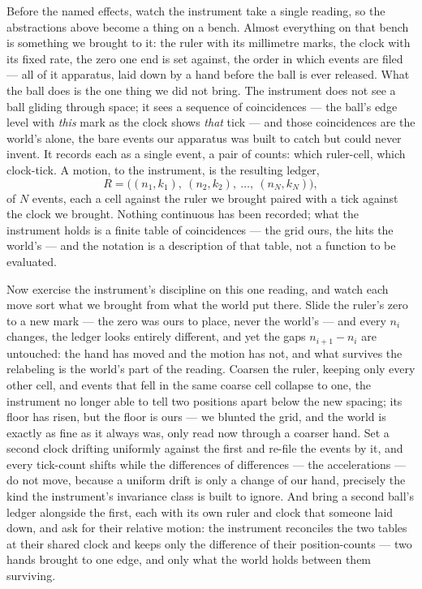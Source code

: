 Before the named effects, watch the instrument take a single reading, so the abstractions above become a
thing on a bench. Almost everything on that bench is something we brought to it: the ruler with its millimetre
marks, the clock with its fixed rate, the zero one end is set against, the order in which events are filed ---
all of it apparatus, laid down by a hand before the ball is ever released. What the ball does is the one thing
we did not bring. The instrument does not see a ball gliding through space; it sees a sequence of coincidences
--- the ball's edge level with \emph{this} mark as the clock shows \emph{that} tick --- and those coincidences
are the world's alone, the bare events our apparatus was built to catch but could never invent. It records
each as a single event, a pair of counts: which ruler-cell, which clock-tick. A motion, to the instrument, is
the resulting ledger,
\begin{equation}
  R = \bigl( (n_1, k_1),\ (n_2, k_2),\ \dots,\ (n_N, k_N) \bigr),
\end{equation}
of $N$ events, each a cell against the ruler we brought paired with a tick against the clock we brought.
Nothing continuous has been recorded; what the instrument holds is a finite table of coincidences --- the grid
ours, the hits the world's --- and the notation is a description of that table, not a function to be evaluated.

Now exercise the instrument's discipline on this one reading, and watch each move sort what we brought from
what the world put there. Slide the ruler's zero to a new mark --- the zero was ours to place, never the
world's --- and every $n_i$ changes, the ledger looks entirely different, and yet the gaps $n_{i+1} - n_i$ are
untouched: the hand has moved and the motion has not, and what survives the relabeling is the world's part of
the reading. Coarsen the ruler, keeping only every other cell, and events that fell in the same coarse cell
collapse to one, the instrument no longer able to tell two positions apart below the new spacing; its floor
has risen, but the floor is ours --- we blunted the grid, and the world is exactly as fine as it always was,
only read now through a coarser hand. Set a second clock drifting uniformly against the first and re-file the
events by it, and every tick-count shifts while the differences of differences --- the accelerations --- do
not move, because a uniform drift is only a change of our hand, precisely the kind the instrument's invariance
class is built to ignore. And bring a second ball's ledger alongside the first, each with its own ruler and
clock that someone laid down, and ask for their relative motion: the instrument reconciles the two tables at
their shared clock and keeps only the difference of their position-counts --- two hands brought to one edge,
and only what the world holds between them surviving.

